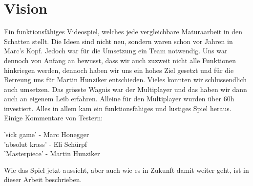 \chapter{Vision}

Ein funktionsfähiges Videospiel, welches jede vergleichbare Maturaarbeit in den Schatten stellt.
Die Ideen sind nicht neu, sondern waren schon vor Jahren in Marc's Kopf.
Jedoch war für die Umsetzung ein Team notwendig.
Uns war dennoch von Anfang an bewusst,
dass wir auch zuzweit nicht alle Funktionen hinkriegen werden, dennoch haben wir uns ein hohes Ziel gesetzt und für die Betreung uns für Martin Hunziker entschieden.
Vieles konnten wir schlussendlich auch umsetzen.
Das grösste Wagnis war der Multiplayer und das haben wir dann auch an eigenem Leib erfahren.
Alleine für den Multiplayer wurden über 60h investiert.
Alles in allem kam ein funktionsfähiges und lustiges Spiel heraus.
Einige Kommentare von Testern:
\begin{center}
    'sick game' - Marc Honegger \\
    'absolut krass' - Eli Schürpf \\
    'Masterpiece' - Martin Hunziker
\end{center}
Wie das Spiel jetzt aussieht, aber auch wie es in Zukunft damit weiter geht, ist in dieser Arbeit beschrieben.